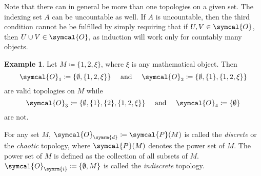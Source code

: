 \documentclass[a4 paper, 12pt]{book}
\theoremstyle{definition}
\newtheorem{exmp}{Example}
\newcommand{\topology}{\symcal{O}}
\newcommand{\powerset}{\symcal{P}}
\begin{document}
    Note that there can in general be more than one topologies on a given set. The indexing set \(A\) can be uncountable as well. If \(A\) is uncountable, then the third condition cannot be be fulfilled by simply requiring that if \(U,V \in \topology\), then \(U \cup V \in \topology\), as induction will work only for countably many objects.
    \begin{exmp}
        Let \(M \coloneq \{1, 2, \xi\}\), where \(\xi\) is any mathematical object. Then \[\topology_1 \coloneq \{\emptyset, \{1, 2, \xi\}\} \quad \text{ and } \quad \topology_2 \coloneq \{\emptyset, \{1\}, \{1, 2, \xi\}\}\] are valid topologies on \(M\) while \[\topology_3 \coloneq \{\emptyset, \{1\}, \{2\}, \{1, 2, \xi\}\} \quad \text{ and } \quad \topology_4 \coloneq \{\emptyset\}\] are not.
    \end{exmp}
    For any set \(M\), \(\topology_{\symrm{d}} \coloneq \powerset(M)\) is called the \textit{discrete} or the \textit{chaotic} topology, where \(\powerset(M)\) denotes the power set of \(M\). The power set of \(M\) is defined as the collection of all subsets of \(M\). \(\topology_{\symrm{i}} \coloneq \{\emptyset, M\}\) is called the \textit{indiscrete} topology.
\end{document}

